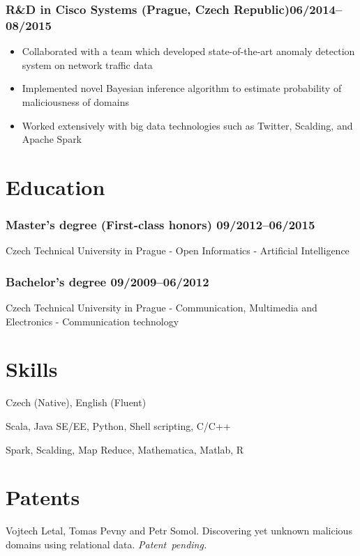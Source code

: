 \documentclass[10pt]{article}
\begin{document}
\subsubsection*{R\&D in Cisco Systems (Prague, Czech Republic)\hfill 06/2014--08/2015}
	 \begin{itemize}
		\setlength\itemsep{-0.25em}
		\item Collaborated with a team which developed state-of-the-art anomaly detection system on network traffic data
		\item Implemented novel Bayesian inference algorithm to estimate probability of maliciousness of domains
		\item Worked extensively with big data technologies such as Twitter, Scalding, and Apache Spark
	 \end{itemize}

\section*{Education}
\subsubsection*{\bf Master’s degree (First-class honors) \hfill 09/2012--06/2015}
\vspace{-1.5mm}
Czech Technical University in Prague - Open Informatics - Artificial Intelligence
\vspace{-1.5mm}
\subsubsection*{\bf Bachelor’s degree \hfill 09/2009--06/2012}
\vspace{-1.5mm}
Czech Technical University in Prague - Communication, Multimedia and Electronics - Communication technology

\section*{Skills}
\begin{description}
	\setlength\itemsep{0.05em}
	\item[Languages] Czech (Native), English (Fluent)
	\item[Programming]  Scala, Java SE/EE, Python, Shell scripting, C/C++
	\item[Analytics]  Spark, Scalding, Map Reduce, Mathematica, Matlab, R
\end{description}

\section*{Patents}
Vojtech Letal, Tomas Pevny and Petr Somol. Discovering yet unknown malicious domains using relational data. {\it Patent~pending.}
\end{document}
